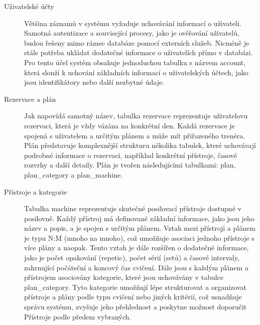 \begin{description}
    \item[Uživatelské účty] Většina záznamů v systému vyžaduje uchovávání informací o uživateli. Samotná autentizace a související procesy, jako je ověřování uživatelů, budou řešeny mimo rámec databáze pomocí externích služeb. Nicméně je stále potřeba ukládat dodatečné informace o uživatelích přímo v databázi. Pro tento účel systém obsahuje jednoduchou tabulku s názvem account, která slouží k uchování základních informací o uživatelských účtech, jako jsou identifikátory nebo další nezbytné údaje.
    \item[Rezervace a plán] Jak napovídá samotný název, tabulka rezervace reprezentuje uživatelovu rezervaci, která je vždy vázána na konkrétní den. Každá rezervace je spojená s uživatelem a určitým plánem a může mít přiřazeného trenéra. Plán představuje komplexnější strukturu několika tabulek, které uchovávají podrobné informace o rezervaci, například konkrétní přístroje, časové rozvrhy a další detaily. Plán je tvořen následujícími tabulkami: plan, plan\_category a plan\_machine.
    \item[Přístroje a kategorie] Tabulka machine reprezentuje skutečné posilovací přístroje dostupné v posilovně. Každý přístroj má definované základní informace, jako jsou jeho název a popis, a je spojen s určitým plánem. Vztah mezi přístroji a plánem je typu N:M (mnoho na mnoho), což umožňuje asociaci jednoho přístroje s více plány a naopak. Tento vztah je dále rozšířen o dodatečné informace, jako je počet opakování (repetic), počet sérií (setů) a časové intervaly, zahrnující počáteční a koncový čas cvičení. Dále jsou s každým plánem a přístrojem asociovány kategorie, které jsou uchovávány v tabulce plan\_category. Tyto kategorie umožňují lépe strukturovat a organizovat přístroje a plány podle typu cvičení nebo jiných kritérií, což usnadňuje správu systému, zvyšuje jeho přehlednost a poskytne možnost doporučit Přístroje podle předem vybraných.
\end{description}
